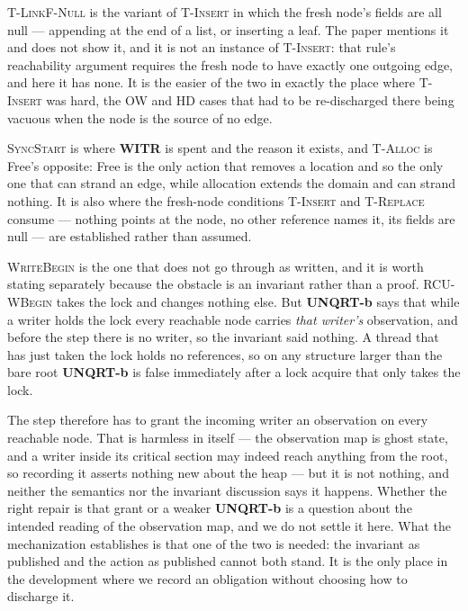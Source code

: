\textsc{T-LinkF-Null} is the variant of \textsc{T-Insert} in which the fresh
node's \RCU{} fields are all null --- appending at the end of a list, or
inserting a leaf.  The paper mentions it and does not show it, and it is not an
instance of \textsc{T-Insert}: that rule's reachability argument requires the
fresh node to have exactly one outgoing edge, and here it has none.  It is the
easier of the two in exactly the place where \textsc{T-Insert} was hard, the OW
and HD cases that had to be re-discharged there being vacuous when the node is
the source of no edge.

\textsc{SyncStart} is where \textbf{WITR} is spent and the reason it exists, and
\textsc{T-Alloc} is Free's opposite: Free is the only action that removes a
location and so the only one that can strand an edge, while allocation extends
the domain and can strand nothing.  It is also where the fresh-node conditions
\textsc{T-Insert} and \textsc{T-Replace} consume --- nothing points at the node,
no other reference names it, its fields are null --- are established rather than
assumed.

\textsc{WriteBegin} is the one that does not go through as written, and it is
worth stating separately because the obstacle is an invariant rather than a
proof.  \textsc{RCU-WBegin} takes the lock and changes nothing else.  But
\textbf{UNQRT-b} says that while a writer holds the lock every reachable node
carries \emph{that writer's} \itr{} observation, and before the step there is no
writer, so the invariant said nothing.  A thread that has just taken the lock
holds no references, so on any structure larger than the bare root
\textbf{UNQRT-b} is false immediately after a lock acquire that only takes the
lock.

The step therefore has to grant the incoming writer an \itr{} observation on
every reachable node.  That is harmless in itself --- the observation map is
ghost state, and a writer inside its critical section may indeed reach anything
from the root, so recording it asserts nothing new about the heap --- but it is
not nothing, and neither the semantics nor the invariant discussion says it
happens.  Whether the right repair is that grant or a weaker \textbf{UNQRT-b} is
a question about the intended reading of the observation map, and we do not
settle it here.  What the mechanization establishes is that one of the two is
needed: the invariant as published and the action as published cannot both
stand.  It is the only place in the development where we record an obligation
without choosing how to discharge it.

